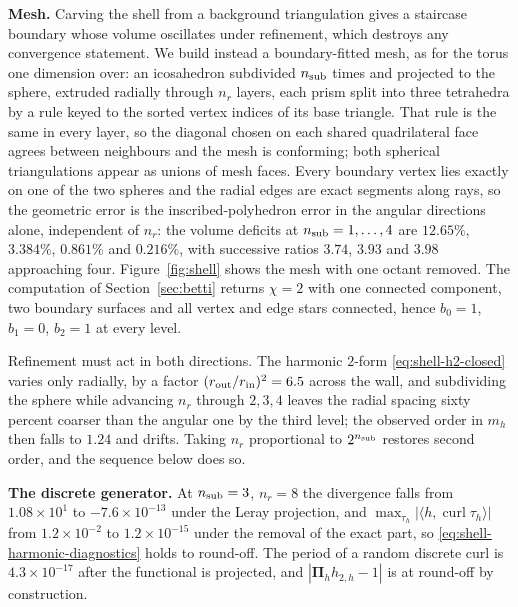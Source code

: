 \documentclass{article}
\DeclareMathOperator{\curl}{curl}
\newcommand{\Piop}{\boldsymbol\Pi}
\newcommand{\ip}[2]{\langle #1,#2\rangle}
\begin{document}
 
 
\noindent\textbf{Mesh.}
Carving the shell from a background triangulation gives a staircase
boundary whose volume oscillates under refinement, which destroys any
convergence statement. We build instead a boundary-fitted mesh, as for
the torus one dimension over: an icosahedron subdivided $n_{\rm sub}$
times and projected to the sphere, extruded radially through $n_r$
layers, each prism split into three tetrahedra by a rule keyed to the
sorted vertex indices of its base triangle. That rule is the same in
every layer, so the diagonal chosen on each shared quadrilateral face
agrees between neighbours and the mesh is conforming; both spherical
triangulations appear as unions of mesh faces. Every boundary vertex
lies exactly on one of the two spheres and the radial edges are exact
segments along rays, so the geometric error is the inscribed-polyhedron
error in the angular directions alone, independent of $n_r$: the volume
deficits at $n_{\rm sub}=1,\dots,4$ are $12.65\%$, $3.384\%$,
$0.861\%$ and $0.216\%$, with successive ratios $3.74$, $3.93$ and
$3.98$ approaching four. Figure~\ref{fig:shell} shows the mesh with one
octant removed. The computation of Section~\ref{sec:betti} returns
$\chi=2$ with one connected component, two boundary surfaces and all
vertex and edge stars connected, hence $b_0=1$, $b_1=0$, $b_2=1$ at
every level.
 
Refinement must act in both directions. The harmonic $2$-form
\eqref{eq:shell-h2-closed} varies only radially, by a factor
$(r_{\rm out}/r_{\rm in})^2=6.5$ across the wall, and subdividing the
sphere while advancing $n_r$ through $2,3,4$ leaves the radial spacing
sixty percent coarser than the angular one by the third level; the
observed order in $m_h$ then falls to $1.24$ and drifts. Taking $n_r$
proportional to $2^{n_{\rm sub}}$ restores second order, and the
sequence below does so.
 
\medskip
\noindent\textbf{The discrete generator.}
At $n_{\rm sub}=3$, $n_r=8$ the divergence falls from
$1.08\times10^1$ to $-7.6\times10^{-13}$ under the Leray projection,
and $\max_{\tau_h}|\ip{h}{\curl\tau_h}|$ from $1.2\times10^{-2}$ to
$1.2\times10^{-15}$ under the removal of the exact part, so
\eqref{eq:shell-harmonic-diagnostics} holds to round-off. The period of
a random discrete curl is $4.3\times10^{-17}$ after the functional is
projected, and $|\Piop_h h_{2,h}-1|$ is at round-off by construction.
 
\end{document}
